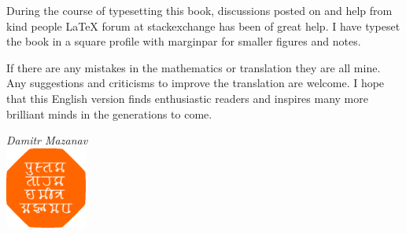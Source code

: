 During the course of typesetting this book, discussions posted on and help from kind people \LaTeX{} forum at stackexchange has been of great help. I have typeset the book in a square profile with marginpar for smaller figures and notes. 

If there are any mistakes in the mathematics or translation they are all mine. Any suggestions and criticisms to improve the translation are welcome. I hope that this English version finds enthusiastic readers and inspires many more brilliant minds in the generations to come.

\begin{flushright}
\emph{Damitr Mazanav}\\[5pt]
\includegraphics[width=0.2\textwidth]{figures/pustaktarak.pdf}
\end{flushright}
